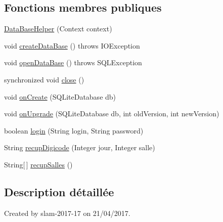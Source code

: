 \subsection*{Fonctions membres publiques}
\begin{DoxyCompactItemize}
\item 
\hyperlink{classcom_1_1example_1_1slam__2017__17_1_1digicode__hertel_1_1_data_base_helper_aa76474b180d0e7768eb06c2aca5a248f}{Data\+Base\+Helper} (Context context)
\item 
void \hyperlink{classcom_1_1example_1_1slam__2017__17_1_1digicode__hertel_1_1_data_base_helper_a656ab8a7805419414c90ea2b9eeb8900}{create\+Data\+Base} ()  throws I\+O\+Exception 
\item 
void \hyperlink{classcom_1_1example_1_1slam__2017__17_1_1digicode__hertel_1_1_data_base_helper_a6467f9cd8cc5811f53fb16d41ca7d17d}{open\+Data\+Base} ()  throws S\+Q\+L\+Exception 
\item 
synchronized void \hyperlink{classcom_1_1example_1_1slam__2017__17_1_1digicode__hertel_1_1_data_base_helper_a9ff7a57fb91953565e199d3e9a106a26}{close} ()
\item 
void \hyperlink{classcom_1_1example_1_1slam__2017__17_1_1digicode__hertel_1_1_data_base_helper_ac5e2fed16a8cb6b58b2768d76f8e324b}{on\+Create} (S\+Q\+Lite\+Database db)
\item 
void \hyperlink{classcom_1_1example_1_1slam__2017__17_1_1digicode__hertel_1_1_data_base_helper_a73dd312883a54c1303ed2da7c2b0c3ca}{on\+Upgrade} (S\+Q\+Lite\+Database db, int old\+Version, int new\+Version)
\item 
boolean \hyperlink{classcom_1_1example_1_1slam__2017__17_1_1digicode__hertel_1_1_data_base_helper_a818c178234e3dc3fb763445813f65153}{login} (String login, String password)
\item 
String \hyperlink{classcom_1_1example_1_1slam__2017__17_1_1digicode__hertel_1_1_data_base_helper_a46c4117ccf1619dfe442ddf270e56c0d}{recup\+Digicode} (Integer jour, Integer salle)
\item 
String\mbox{[}$\,$\mbox{]} \hyperlink{classcom_1_1example_1_1slam__2017__17_1_1digicode__hertel_1_1_data_base_helper_af2239ca86b047c247925472348ab22a2}{recup\+Salles} ()
\end{DoxyCompactItemize}


\subsection{Description détaillée}
Created by slam-\/2017-\/17 on 21/04/2017. 

